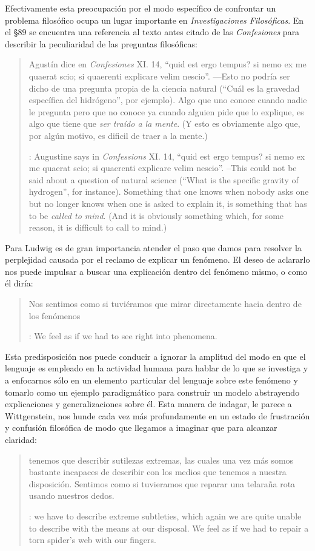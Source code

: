 Efectivamente esta preocupación por el modo específico de confrontar un problema
filosófico ocupa un lugar importante en \emph{Investigaciones Filosóficas}. En
el \S89 se encuentra una referencia al texto antes citado de las
\emph{Confesiones} para describir la peculiaridad de las preguntas filosóficas:
\blockquote[{\cite[\S89]{wittgenstein1953phiinv}}: Augustine says in
\emph{Confessions} XI. 14, \enquote{quid est ergo tempus? si nemo ex me quaerat
  scio; si quaerenti explicare velim nescio}. --This could not be said about a
question of natural science (\enquote{What is the specific gravity of hydrogen},
for instance). Something that one knows when nobody asks one but no longer knows
when one is asked to explain it, is something that has to be \emph{called to
  mind}. (And it is obviously something which, for some reason, it is difficult
to call to mind.)]{Agustín dice en \emph{Confesiones} XI. 14, \enquote{quid est
    ergo tempus? si nemo ex me quaerat scio; si quaerenti explicare velim
    nescio}. ---Esto no podría ser dicho de una pregunta propia de la ciencia
  natural (\enquote{Cuál es la gravedad específica del hidrógeno}, por ejemplo).
  Algo que uno conoce cuando nadie le pregunta pero que no conoce ya cuando
  alguien pide que lo explique, es algo que tiene que \emph{ser traído a la
    mente}. (Y esto es obviamente algo que, por algún motivo, es dificil de
  traer a la mente.)}
Para Ludwig es de gran importancia atender el paso que damos para resolver
la perplejidad causada por el reclamo de explicar un fenómeno. El deseo de
aclararlo nos puede impulsar a buscar una explicación dentro del fenómeno mismo,
o como él diría:
\blockquote[{\cite[\S90]{wittgenstein1953phiinv}}: We feel as if we had to see
right into phenomena.]{Nos sentimos como si tuviéramos que mirar directamente
hacia dentro de los fenómenos}.
Esta predisposición nos puede conducir a ignorar la amplitud del modo en que el
lenguaje es empleado en la actividad humana para hablar de lo que se investiga y
a enfocarnos sólo en un elemento particular del lenguaje sobre este fenómeno y
tomarlo como un ejemplo paradigmático para construir un modelo abstrayendo
explicaciones y generalizaciones sobre él. Esta manera de indagar, le parece a
Wittgenstein, nos hunde cada vez más profundamente en un estado de frustración y
confusión filosófica de modo que llegamos a imaginar que para alcanzar claridad:
\blockquote[{\cite[\S106]{wittgenstein1953phiinv}}: we have to describe extreme
subtleties, which again we are quite unable to describe with the means at our
disposal. We feel as if we had to repair a torn spider's web with our fingers.
]{tenemos que describir sutilezas extremas, las cuales una vez más somos
  bastante incapaces de describir con los medios que tenemos a nuestra
  disposición. Sentimos como si tuvieramos que reparar una telaraña rota usando
  nuestros dedos.}

